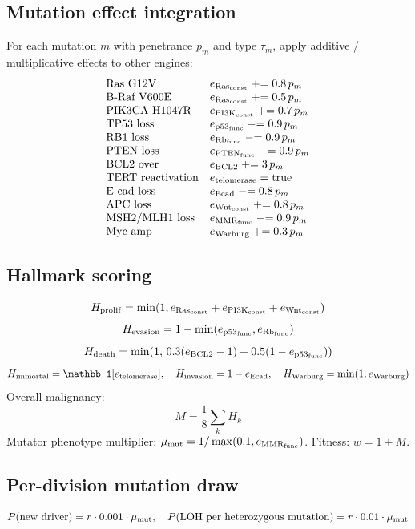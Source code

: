 \documentclass[11pt,a4paper]{article}
\newcommand{\eq}[1]{\begin{equation}#1\end{equation}}
\begin{document}
\subsection{Mutation effect integration}
For each mutation $m$ with penetrance $p_m$ and type $\tau_m$, apply additive / multiplicative effects to other engines:
\[ \begin{array}{ll}
\text{Ras G12V}  & e_{\rm Ras_{\rm const}}\mathrel{+}=0.8\,p_m \\
\text{B-Raf V600E}& e_{\rm Ras_{\rm const}}\mathrel{+}=0.5\,p_m \\
\text{PIK3CA H1047R}& e_{\rm PI3K_{\rm const}}\mathrel{+}=0.7\,p_m \\
\text{TP53 loss} & e_{\rm p53_{\rm func}}\mathrel{-}=0.9\,p_m \\
\text{RB1 loss} & e_{\rm Rb_{\rm func}}\mathrel{-}=0.9\,p_m \\
\text{PTEN loss} & e_{\rm PTEN_{\rm func}}\mathrel{-}=0.9\,p_m \\
\text{BCL2 over} & e_{\rm BCL2}\mathrel{+}=3\,p_m \\
\text{TERT reactivation} & e_{\rm telomerase} = \text{true} \\
\text{E-cad loss} & e_{\rm Ecad}\mathrel{-}=0.8\,p_m \\
\text{APC loss} & e_{\rm Wnt_{\rm const}}\mathrel{+}=0.8\,p_m \\
\text{MSH2/MLH1 loss} & e_{\rm MMR_{\rm func}}\mathrel{-}=0.9\,p_m \\
\text{Myc amp} & e_{\rm Warburg}\mathrel{+}=0.3\,p_m
\end{array} \]

\subsection{Hallmark scoring}
\eq{ H_{\rm prolif}=\min(1, e_{\rm Ras_{\rm const}}+e_{\rm PI3K_{\rm const}}+e_{\rm Wnt_{\rm const}}) }
\eq{ H_{\rm evasion}=1-\min(e_{\rm p53_{\rm func}},e_{\rm Rb_{\rm func}}) }
\eq{ H_{\rm death}=\min(1,\,0.3(e_{\rm BCL2}-1)+0.5(1-e_{\rm p53_{\rm func}})) }
\eq{ H_{\rm immortal}=\mathbb 1[e_{\rm telomerase}],\quad H_{\rm invasion}=1-e_{\rm Ecad},\quad H_{\rm Warburg}=\min(1,e_{\rm Warburg}) }
Overall malignancy:
\eq{ M=\frac{1}{8}\sum_k H_k }
Mutator phenotype multiplier: $\mu_{\rm mut}=1/\max(0.1,e_{\rm MMR_{\rm func}})$.
Fitness: $w=1+M$.

\subsection{Per-division mutation draw}
\eq{ P(\text{new driver}) = r\cdot 0.001\cdot\mu_{\rm mut},\quad P(\text{LOH per heterozygous mutation}) = r\cdot 0.01\cdot\mu_{\rm mut} }
\end{document}
